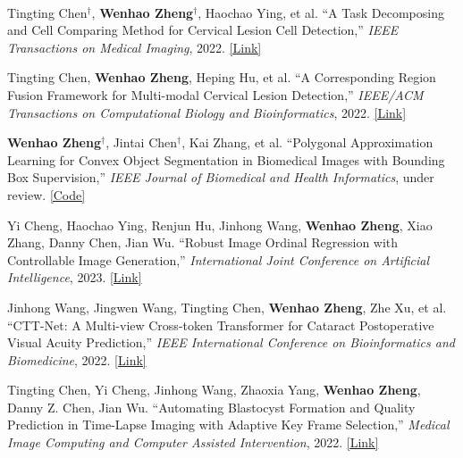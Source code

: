 
\begin{cventries}

    \cventry
    {} %
    {\ } %
    {\ } %
    {} %
    {
        \vspace{-8mm}
        \begin{cvitemize2}
            \item Tingting Chen$^\dagger$, \textbf{Wenhao Zheng$^\dagger$}, Haochao Ying, et al. ``A Task Decomposing and Cell Comparing Method for Cervical Lesion Cell Detection,'' \textit{IEEE Transactions on Medical Imaging}, 2022. \href{https://ieeexplore.ieee.org/document/9744114}{\textcolor{link}{[Link]}}
            \vspace{1mm}
            \item Tingting Chen, \textbf{Wenhao Zheng}, Heping Hu, et al. ``A Corresponding Region Fusion Framework for Multi-modal Cervical Lesion Detection,'' \textit{IEEE/ACM Transactions on Computational Biology and Bioinformatics}, 2022. \href{https://ieeexplore.ieee.org/document/9784879}{\textcolor{link}{[Link]}}
            \vspace{1mm}
            \item \textbf{Wenhao Zheng$^\dagger$}, Jintai Chen$^\dagger$, Kai Zhang, et al. ``Polygonal Approximation Learning for Convex Object Segmentation in Biomedical Images with Bounding Box Supervision,'' \textit{IEEE Journal of Biomedical and Health Informatics}, under review. \href{https://github.com/shenmishajing/PAL}{\textcolor{link}{[Code]}}
            \vspace{1mm}
            \item Yi Cheng, Haochao Ying, Renjun Hu, Jinhong Wang, \textbf{Wenhao Zheng}, Xiao Zhang, Danny Chen, Jian Wu. ``Robust Image Ordinal Regression with Controllable Image Generation,'' \textit{International Joint Conference on Artificial Intelligence}, 2023. \href{https://arxiv.org/abs/2305.04213}{\textcolor{link}{[Link]}}
            \vspace{1mm}
            \item Jinhong Wang, Jingwen Wang, Tingting Chen, \textbf{Wenhao Zheng}, Zhe Xu, et al. ``CTT-Net: A Multi-view Cross-token Transformer for Cataract Postoperative Visual Acuity Prediction,'' \textit{IEEE International Conference on Bioinformatics and Biomedicine}, 2022. \href{https://ieeexplore.ieee.org/document/9995392}{\textcolor{link}{[Link]}}
            \vspace{1mm}
            \item Tingting Chen, Yi Cheng, Jinhong Wang, Zhaoxia Yang, \textbf{Wenhao Zheng}, Danny Z. Chen, Jian Wu. ``Automating Blastocyst Formation and Quality Prediction in Time-Lapse Imaging with Adaptive Key Frame Selection,'' \textit{Medical Image Computing and Computer Assisted Intervention}, 2022. \href{https://link.springer.com/chapter/10.1007/978-3-031-16440-8_43}{\textcolor{link}{[Link]}}
        \end{cvitemize2}
    }
\end{cventries}
